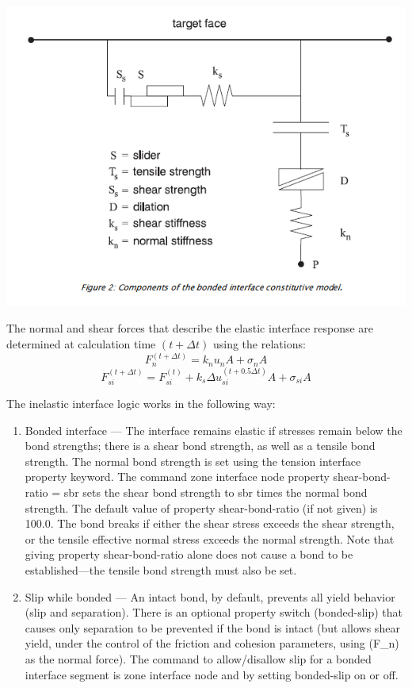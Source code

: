 \documentclass[a4paper, nobind]{templates/ociamthesis}
\begin{document}
\includegraphics[width=1\linewidth]{myfigureeeeee/interface-constitutive}

The normal and shear forces that describe the elastic interface response are determined at calculation time \((t + \Delta t)\) using the relations:\\

\[ F_n^{(t + \Delta t)} = k_n u_n A + \sigma_n A  \]
\[ F_{si}^{(t + \Delta t)} = F_{si}^{(t)} + k_s \Delta u_{si}^{(t + 0.5 \Delta t)} A + \sigma_{si} A\]

The inelastic interface logic works in the following way:\\

\begin{enumerate}
\def\labelenumi{\arabic{enumi}.}
\item
  Bonded interface --- The interface remains elastic if stresses remain below the bond strengths; there is a shear bond strength, as well as a tensile bond strength. The normal bond strength is set using the tension interface property keyword. The command zone interface node property shear-bond-ratio = sbr sets the shear bond strength to sbr times the normal bond strength. The default value of property shear-bond-ratio (if not given) is 100.0. The bond breaks if either the shear stress exceeds the shear strength, or the tensile effective normal stress exceeds the normal strength. Note that giving property shear-bond-ratio alone does not cause a bond to be established---the tensile bond strength must also be set.\\
\item
  Slip while bonded --- An intact bond, by default, prevents all yield behavior (slip and separation). There is an optional property switch (bonded-slip) that causes only separation to be prevented if the bond is intact (but allows shear yield, under the control of the friction and cohesion parameters, using (F\_n) as the normal force). The command to allow/disallow slip for a bonded interface segment is zone interface node and by setting bonded-slip on or off.\\
\end{enumerate}
\end{document}

